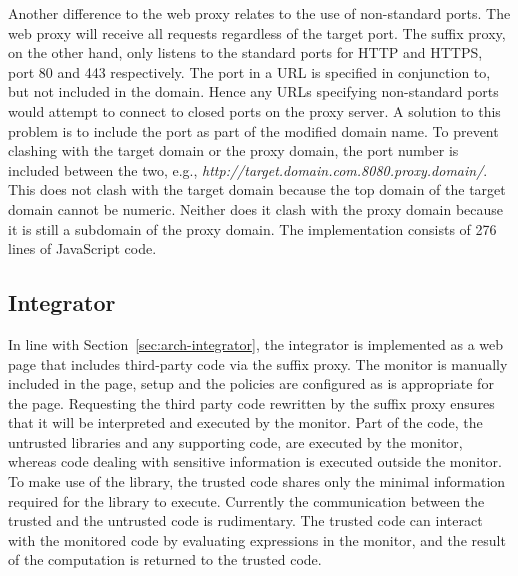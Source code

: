 \documentclass{llncs}
\begin{document}
Another difference to the web proxy relates to the use of non-standard ports.
The web proxy will receive all requests regardless of the target port. The 
suffix proxy, on the other hand, only listens to the standard ports for HTTP and HTTPS, port 80 and 
443 respectively. The port in a URL is specified in conjunction to, but not included in the domain.
Hence any URLs specifying non-standard ports would attempt to connect to closed 
ports on the proxy server. A solution to this problem is to include the port as part 
of the modified domain name. To prevent clashing with the target domain or the proxy domain, 
the port number is included between the two, e.g., \emph{http://target.domain.com.8080.proxy.domain/}.
This does not clash with the target domain because the top domain of the target domain cannot be numeric.
Neither does it clash with the proxy domain because it is still a subdomain of the proxy domain.
%
The implementation consists of 276 lines of JavaScript code.

\vspace{-.4cm}
\subsection{Integrator}
\vspace{-.2cm}


In line with Section~\ref{sec:arch-integrator}, the integrator is implemented as 
a web page that includes third-party code via the suffix proxy. The monitor is 
manually included in the page, setup and the policies are configured as is 
appropriate for the page. Requesting the third party code rewritten by the suffix 
proxy ensures that it will be interpreted and executed by the 
monitor.
%
Part of the code, the untrusted libraries and any supporting code,
are executed by the monitor, whereas code dealing with sensitive 
information is executed outside the monitor. To make use of the library, 
the trusted code shares only the minimal information required for the 
library to execute. Currently the communication between the trusted and the 
untrusted code is rudimentary. The trusted code can interact with the monitored 
code by evaluating expressions in the monitor, and the result of the computation
is returned to the trusted code. 
\end{document}
